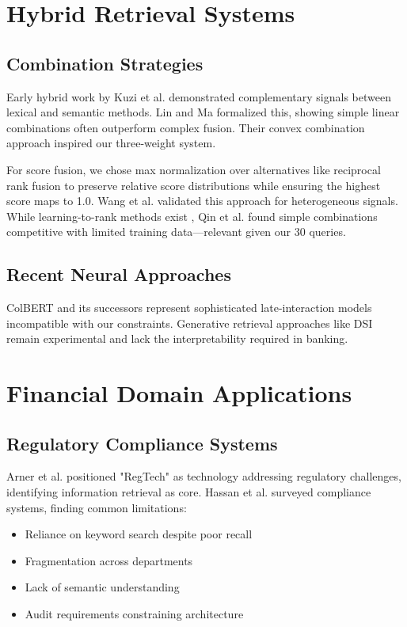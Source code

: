 \section{Hybrid Retrieval Systems}

\subsection{Combination Strategies}

Early hybrid work by Kuzi et al. \cite{kuzi2020hybrid} demonstrated complementary signals between lexical and semantic methods. Lin and Ma \cite{lin2021pretrained} formalized this, showing simple linear combinations often outperform complex fusion. Their convex combination approach inspired our three-weight system.

For score fusion, we chose max normalization over alternatives like reciprocal rank fusion \cite{cormack2009rrf} to preserve relative score distributions while ensuring the highest score maps to 1.0. Wang et al. \cite{wang2023improving} validated this approach for heterogeneous signals. While learning-to-rank methods exist \cite{liu2009learning,burges2005learning}, Qin et al. \cite{qin2021neural} found simple combinations competitive with limited training data—relevant given our 30 queries.

\subsection{Recent Neural Approaches}

ColBERT \cite{khattab2020colbert} and its successors represent sophisticated late-interaction models incompatible with our constraints. Generative retrieval approaches like DSI \cite{tay2022transformer} remain experimental and lack the interpretability required in banking.

\section{Financial Domain Applications}

\subsection{Regulatory Compliance Systems}

Arner et al. \cite{arner2017fintech} positioned "RegTech" as technology addressing regulatory challenges, identifying information retrieval as core. Hassan et al. \cite{hassan2022compliance} surveyed compliance systems, finding common limitations:
\begin{itemize}[leftmargin=*,itemsep=2pt,topsep=2pt]
 \item Reliance on keyword search despite poor recall
 \item Fragmentation across departments  
 \item Lack of semantic understanding
 \item Audit requirements constraining architecture
\end{itemize}

